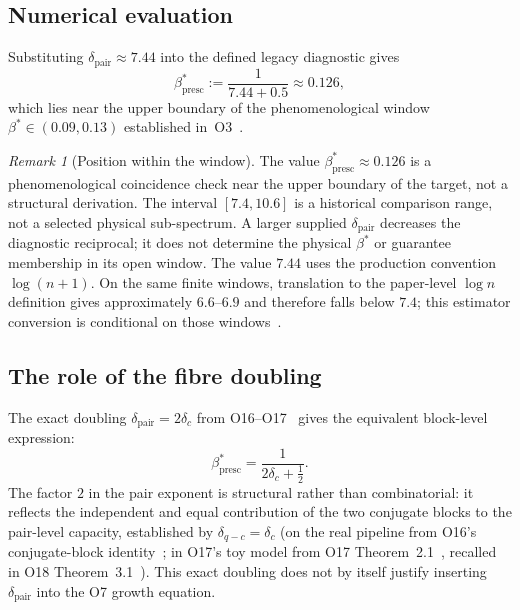 \documentclass[11pt,a4paper]{article}
\theoremstyle{definition}
\theoremstyle{remark}
\newtheorem{remark}[theorem]{Remark}
\begin{document}
  \subsection{Numerical evaluation}

    Substituting $\delta_{\mathrm{pair}} \approx 7.44$
    into the defined legacy diagnostic gives
    \begin{equation}
      \label{eq:beta-numerical}
      \beta^*_{\mathrm{presc}}
      := \frac{1}{7.44 + 0.5}
      \approx 0.126,
    \end{equation}
    which lies near the upper boundary of the phenomenological
    window $\beta^* \in (0.09, 0.13)$ established
    in~O3~\cite{Beau2026a7}.

    \begin{remark}[Position within the window]
      \label{rem:window-position}
      The value $\beta^*_{\mathrm{presc}} \approx 0.126$ is a
      phenomenological coincidence check near the upper boundary
      of the target, not a structural derivation.
      The interval $[7.4,10.6]$ is a historical comparison range, not a selected physical sub-spectrum.
      A larger supplied $\delta_{\mathrm{pair}}$ decreases the diagnostic reciprocal; it does
      not determine the physical $\beta^*$ or guarantee membership in its open window.
      The value $7.44$ uses the production convention
      $\log(n+1)$.
      On the same finite windows, translation to the paper-level
      $\log n$ definition gives approximately $6.6$--$6.9$ and
      therefore falls below $7.4$; this estimator conversion is
      conditional on those windows~\cite{Beau2026sgn}.
    \end{remark}

  \subsection{The role of the fibre doubling}

    The exact doubling $\delta_{\mathrm{pair}} = 2\delta_c$
    from O16--O17~\cite{Beau2026a20,Beau2026a21} gives the
    equivalent block-level expression:
    \begin{equation}
      \label{eq:transfer-block}
      \beta^*_{\mathrm{presc}}
      = \frac{1}{2\delta_c + \tfrac{1}{2}}.
    \end{equation}
    The factor $2$ in the pair exponent is structural rather than
    combinatorial: it reflects the independent and equal
    contribution of the two conjugate blocks to the pair-level
    capacity, established by $\delta_{q-c} = \delta_c$ (on the real pipeline from O16's
    conjugate-block identity~\cite{Beau2026a20}; in O17's toy model from O17
    Theorem~2.1~\cite{Beau2026a21}, recalled in O18 Theorem~3.1~\cite{Beau2026a22}).
    This exact doubling does not by itself justify inserting
    $\delta_{\mathrm{pair}}$ into the O7 growth equation.
\end{document}
